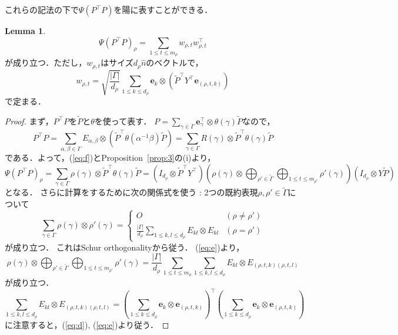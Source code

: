 \documentclass[11pt]{article}
\theoremstyle{definition}
\newtheorem{lemma}[defi]{Lemma}
\begin{document}
    これらの記法の下で$\Psi(P^\top P)$を陽に表すことができる．
    \begin{lemma} \label{lem:1}
        \[
        \Psi(P^\top P)_\rho = \sum_{1 \leq t \leq m_\rho} w_{\rho,t} w_{\rho,t}^\top
        \]
        が成り立つ．ただし，$w_{\rho,t}$はサイズ$d_\rho \hat{n}$のベクトルで，
        \[
            w_{\rho,t}= \sqrt{\frac{|\Gamma|}{d_\rho}} \sum_{1 \leq k \leq d_\rho} \bm{e}_k \otimes (\tilde{P}^\top Y^\top \bm{e}_{(\rho,t,k)})
        \]
        で定まる．
    \end{lemma}
    \begin{proof}
        まず，$P^\top P$を$\tilde{P}$と$\theta$を使って表す．
        $P=\sum_{\gamma \in \Gamma} \bm{e}_\gamma^\top \otimes \theta(\gamma) \tilde{P}$なので，
        \[
            P^\top P
            =\sum_{\alpha,\beta \in \Gamma} E_{\alpha,\beta} \otimes ( \tilde{P}^\top \theta(\alpha^{-1} \beta) \tilde{P})
            =\sum_{\gamma \in \Gamma} R(\gamma) \otimes \tilde{P}^\top \theta(\gamma) \tilde{P}
        \]
        である．よって，(\ref{eq:f})とProposition~\ref{prop:3}の(i)より，
        \begin{equation} \label{eq:d}
            \Psi(P^\top P)_\rho = \sum_{\gamma \in \Gamma} \rho(\gamma) \otimes \tilde{P}^\top \theta(\gamma) \tilde{P}
            =(I_{d_\rho} \otimes \tilde{P}^\top Y^\top) \left( \rho(\gamma) \otimes \bigoplus_{\rho' \in \tilde{\Gamma}}
            \bigoplus_{1 \leq t \leq m_{\rho'}} \rho'(\gamma) \right) ( I_{d_\rho} \otimes Y\tilde{P})
        \end{equation}
        となる．
        さらに計算をするために次の関係式を使う : 2つの既約表現$\rho, \rho' \in \tilde{\Gamma}$について
        \begin{equation} \label{eq:e}
            \sum_{\gamma \in \Gamma} \rho(\gamma) \otimes \rho'(\gamma) =
            \begin{cases}
                O & (\rho \neq \rho') \\
                \frac{|\Gamma|}{d_\rho} \sum_{1 \leq k,l \leq d_\rho} E_{kl} \otimes E_{kl} & (\rho = \rho')
            \end{cases}
        \end{equation}
        が成り立つ．
        これはSchur orthogonalityから従う．
        (\ref{eq:e})より，
        \begin{equation}
            \rho(\gamma) \otimes \bigoplus_{\rho' \in \tilde{\Gamma}} \bigoplus_{1 \leq t \leq m_{\rho'}} \rho'(\gamma)
            = \frac{|\Gamma|}{d_\rho} \sum_{1\leq t \leq m_{\rho}} \sum_{1 \leq k,l \leq d_\rho} E_{kl} \otimes E_{(\rho,t,k)(\rho,t,l)}
        \end{equation}
        が成り立つ．
        \[
            \sum_{1 \leq k,l \leq d_\rho} E_{kl} \otimes E_{(\rho,t,k)(\rho,t,l)} 
            = \left(\sum_{1 \leq k \leq d_\rho} \bm{e}_k \otimes \bm{e}_{(\rho,t,k)}\right)^\top 
            \left(\sum_{1 \leq k \leq d_\rho} \bm{e}_k \otimes \bm{e}_{(\rho,t,k)}\right)
        \]
        に注意すると，(\ref{eq:d}), (\ref{eq:e})より従う．
    \end{proof}
    
\end{document}
